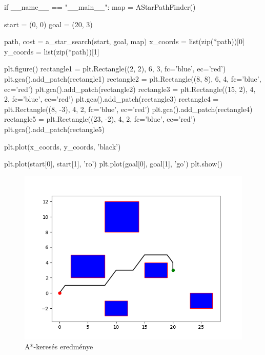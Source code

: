 \begin{python}
if __name__ == "__main__":
    map = AStarPathFinder()

    start = (0, 0)
    goal = (20, 3)

    path, cost = a_star_search(start, goal, map)
    x_coords = list(zip(*path))[0]
    y_coords = list(zip(*path))[1]
    
    plt.figure()
    rectangle1 = plt.Rectangle((2, 2), 6, 3, fc='blue', ec='red')
    plt.gca().add_patch(rectangle1)
    rectangle2 = plt.Rectangle((8, 8), 6, 4, fc='blue', ec='red')
    plt.gca().add_patch(rectangle2)
    rectangle3 = plt.Rectangle((15, 2), 4, 2, fc='blue', ec='red')
    plt.gca().add_patch(rectangle3)
    rectangle4 = plt.Rectangle((8, -3), 4, 2, fc='blue', ec='red')
    plt.gca().add_patch(rectangle4)
    rectangle5 = plt.Rectangle((23, -2), 4, 2, fc='blue', ec='red')
    plt.gca().add_patch(rectangle5)
    
    plt.plot(x_coords, y_coords, 'black')

    plt.plot(start[0], start[1], 'ro')
    plt.plot(goal[0], goal[1], 'go')
    plt.show()
\end{python}


\begin{figure}[h!]
\centering
\includegraphics[scale=0.75]{images/a_star.png}
\caption{A*-keresés eredménye}
\label{fig:a_star}
\end{figure}

\newpage


